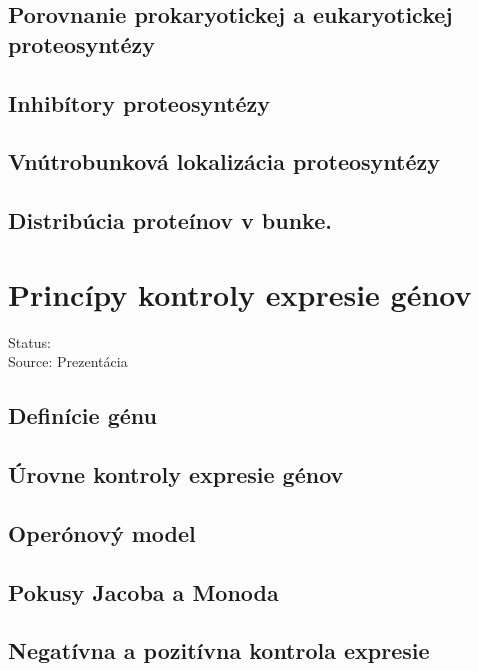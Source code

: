 \subsection{Porovnanie prokaryotickej a eukaryotickej proteosyntézy}

\subsection{Inhibítory proteosyntézy}

\subsection{Vnútrobunková lokalizácia proteosyntézy}

\subsection{Distribúcia proteínov v bunke.}

\section{Princípy kontroly expresie génov}

Status: \\
Source: Prezentácia \\

\subsection{Definície génu}

\subsection{Úrovne kontroly expresie génov}

\subsection{Operónový model}

\subsection{Pokusy Jacoba a Monoda}

\subsection{Negatívna a pozitívna kontrola expresie}

